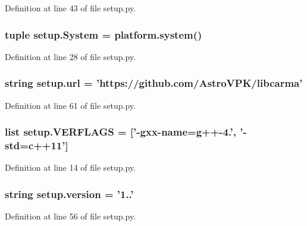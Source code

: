Definition at line 43 of file setup.\-py.

\hypertarget{namespacesetup_a09d66ddf3e3c0276fcc930fa2ec73ab2}{
\subsubsection[{System}]{\setlength{\rightskip}{0pt plus 5cm}tuple setup.\-System = platform.\-system()}}\label{namespacesetup_a09d66ddf3e3c0276fcc930fa2ec73ab2}


Definition at line 28 of file setup.\-py.

\hypertarget{namespacesetup_a3376e8b9735800b5b9e455914cee908d}{
\subsubsection[{url}]{\setlength{\rightskip}{0pt plus 5cm}string setup.\-url = 'https\-://github.\-com/Astro\-V\-P\-K/libcarma'}}\label{namespacesetup_a3376e8b9735800b5b9e455914cee908d}


Definition at line 61 of file setup.\-py.

\hypertarget{namespacesetup_a4b1725ffabf7e972e9416fc047daa758}{
\subsubsection[{V\-E\-R\-F\-L\-A\-G\-S}]{\setlength{\rightskip}{0pt plus 5cm}list setup.\-V\-E\-R\-F\-L\-A\-G\-S = \mbox{[}'-\/gxx-\/{\bf name}=g++-\/4.', '-\/std={\bf c}++11'\mbox{]}}}\label{namespacesetup_a4b1725ffabf7e972e9416fc047daa758}


Definition at line 14 of file setup.\-py.

\hypertarget{namespacesetup_ab177531e7a80674a3db3de2d79eb8be7}{
\subsubsection[{version}]{\setlength{\rightskip}{0pt plus 5cm}string setup.\-version = '1..'}}\label{namespacesetup_ab177531e7a80674a3db3de2d79eb8be7}


Definition at line 56 of file setup.\-py.


